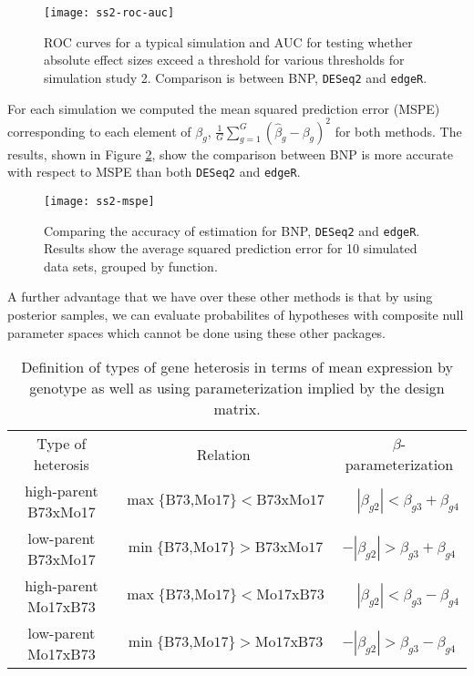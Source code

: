 \begin{figure}[ht!]
\centering
\texttt{[image: ss2-roc-auc]}
\caption{\small ROC curves for a typical simulation and AUC for testing whether absolute effect sizes exceed a threshold for various thresholds for simulation study 2. Comparison is between BNP, \texttt{DESeq2} and \texttt{edgeR}.}
\label{ss2-roc}
\end{figure}

For each simulation we computed the mean squared prediction error (MSPE) corresponding to each element of $\beta_g$, $\frac{1}{G}\sum_{g=1}^G (\hat{\beta}_g-\beta_g)^2$ for both methods. The results, shown in Figure \ref{ss2-mspe}, show the comparison between BNP is more accurate with respect to MSPE than both \texttt{DESeq2} and \texttt{edgeR}.

\begin{figure}[ht!]
\centering
\texttt{[image: ss2-mspe]}
\begin{minipage}{.8\textwidth}
\caption{\small Comparing the accuracy of estimation for BNP, \texttt{DESeq2} and \texttt{edgeR}. Results show the average squared prediction error for 10 simulated data sets, grouped by function.}
\end{minipage}
\label{ss2-mspe}
\end{figure}


A further advantage that we have over these other methods is that by using posterior samples, we can evaluate probabilites of hypotheses with composite null parameter spaces which cannot be done using these other packages.

\begin{table}
\caption{Definition of types of gene heterosis in terms of mean expression by genotype as well as using parameterization implied by the design matrix.}
\label{def-heterosis}
\begin{tabular}{ccc}
Type of heterosis & Relation & $\beta$-parameterization\\
high-parent B73xMo17 & $\max\{\mbox{B73,Mo17}\} < \mbox{B73xMo17}$ & $\phantom{-}|\beta_{g2}| < \beta_{g3} + \beta_{g4}$\\
low-parent B73xMo17  & $\min\{\mbox{B73,Mo17}\} > \mbox{B73xMo17}$ & $-|\beta_{g2}| > \beta_{g3} + \beta_{g4}$\\
high-parent Mo17xB73 & $\max\{\mbox{B73,Mo17}\} < \mbox{Mo17xB73}$ & $\phantom{-}|\beta_{g2}| < \beta_{g3} - \beta_{g4}$\\
low-parent Mo17xB73  & $\min\{\mbox{B73,Mo17}\} > \mbox{Mo17xB73}$ & $-|\beta_{g2}| > \beta_{g3} - \beta_{g4}$
\end{tabular}
\end{table}

